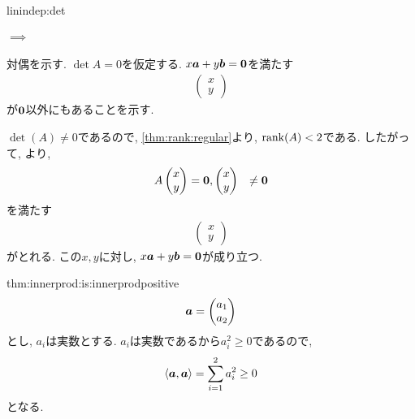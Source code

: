 \begin{proofof}{linindep:det}
  
  \paragraph{$\implies$}
  対偶を示す.
  $\det A=0$を仮定する.
  $x\boldsymbol{a}+y\boldsymbol{b}=\boldsymbol{0}$を満たす
  \begin{align*}
    \begin{pmatrix}x\\y\end{pmatrix}
  \end{align*}
  が$\boldsymbol{0}$以外にもあることを示す.
  
    
  $\det(A)\neq 0$であるので,
  \cref{thm:rank:regular}より,
  $\operatorname{rank}(A)<2$である.
  したがって, より, 
  \begin{align*}
    A\begin{pmatrix}x\\y\end{pmatrix}&=\boldsymbol{0},
    \begin{pmatrix}x\\y\end{pmatrix}&\neq\boldsymbol{0}
  \end{align*}
  を満たす
  \begin{align*}
    \begin{pmatrix}x\\y\end{pmatrix}
  \end{align*}
  がとれる. この$x,y$に対し,
  $x\boldsymbol{a}+y\boldsymbol{b}=\boldsymbol{0}$が成り立つ.
\end{proofof}
\begin{proofof*}{thm:innerprod:is:innerprod}{positive}
  \begin{align*}
        \boldsymbol{a}=\begin{pmatrix}a_1\\a_2\end{pmatrix}
  \end{align*}
  とし,   $a_i$は実数とする.
  $a_i$は実数であるから$a_i^2\geq 0$であるので,
  \begin{align*}
        \Braket{\boldsymbol{a},\boldsymbol{a}}=\sum_{i=1}^2 a_i^2\geq 0
  \end{align*}
  となる. 
\end{proofof*}

